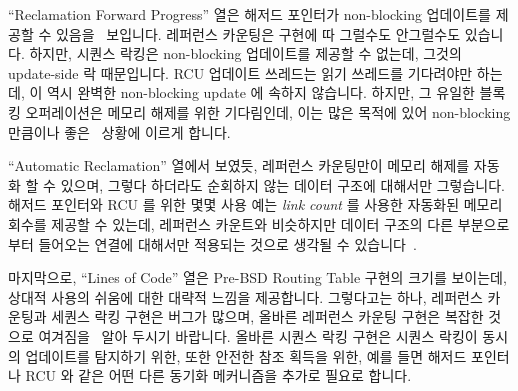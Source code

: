 \fi

``Reclamation Forward Progress'' 열은 해저드 포인터가 non-blocking 업데이트를
제공할 수 있음을~\cite{MagedMichael04a,HerlihyLM02} 보입니다.
레퍼런스 카운팅은 구현에 따 그럴수도 안그럴수도 있습니다.
하지만, 시퀀스 락킹은 non-blocking 업데이트를 제공할 수 없는데, 그것의
update-side 락 때문입니다.
RCU 업데이트 쓰레드는 읽기 쓰레드를 기다려야만 하는데, 이 역시 완벽한
non-blocking update 에 속하지 않습니다.
하지만, 그 유일한 블록킹 오퍼레이션은 메모리 해제를 위한 기다림인데, 이는 많은
목적에 있어 non-blocking 만큼이나 좋은~\cite{MathieuDesnoyers2012URCU} 상황에
이르게 합니다.

``Automatic Reclamation'' 열에서 보였듯, 레퍼런스 카운팅만이 메모리 해제를
자동화 할 수 있으며, 그렇다 하더라도 순회하지 않는 데이터 구조에 대해서만
그렇습니다.
해저드 포인터와 RCU 를 위한 몇몇 사용 예는 \emph{link count} 를 사용한 자동화된
메모리 회수를 제공할 수 있는데, 레퍼런스 카운트와 비슷하지만 데이터 구조의 다른
부분으로부터 들어오는 연결에 대해서만 적용되는 것으로 생각될 수
있습니다~\cite{MagedMichael2018FollyHazptr}.

\iffalse

The ``Reclamation Forward Progress'' row shows that hazard pointers
can provide non-blocking updates~\cite{MagedMichael04a,HerlihyLM02}.
Reference counting might or might not, depending on the implementation.
However, sequence locking cannot provide non-blocking updates, courtesy
of its update-side lock.
RCU updaters must wait on readers, which also rules out fully non-blocking
updates.
However, there are situations in which the only blocking operation is
a wait to free memory, which results in a situation that, for many
purposes, is as good as non-blocking~\cite{MathieuDesnoyers2012URCU}.

As shown in the ``Automatic Reclamation'' row, only reference
counting can automate freeing of memory, and even then only
for non-cyclic data structures.
Certain use cases for hazard pointers and RCU can provide automatic
reclamation using \emph{link counts}, which can be thought of as
reference counts, but applying only to incoming links from other
parts of the data structure~\cite{MagedMichael2018FollyHazptr}.

\fi

마지막으로, ``Lines of Code'' 열은 Pre-BSD Routing Table 구현의 크기를
보이는데, 상대적 사용의 쉬움에 대한 대략적 느낌을 제공합니다.
그렇다고는 하나, 레퍼런스 카운팅과 세퀀스 락킹 구현은 버그가 많으며, 올바른
레퍼런스 카운팅 구현은 복잡한 것으로 여겨짐을~\cite{Valois95a,MagedMichael95a}
알아 두시기 바랍니다.
올바른 시퀀스 락킹 구현은 시퀀스 락킹이 동시의 업데이트를 탐지하기 위한, 또한
안전한 참조 획득을 위한, 예를 들면 해저드 포인터나 RCU 와 같은 어떤 다른 동기화
메커니즘을 추가로 필요로 합니다.

